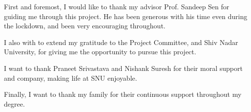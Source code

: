 \begin{acknowledgments}

First and foremost, I would like to thank my advisor Prof. Sandeep Sen for guiding me through this project. He has been generous with his time even during the lockdown, and been very encouraging throughout. 

\noindent
I also with to extend my gratitude to the Project Committee, and Shiv Nadar University, for giving me the opportunity to pursue this project.

\noindent
I want to thank Praneet Srivastava and Nishank Suresh for their moral support and company, making life at SNU enjoyable. 

\noindent
Finally, I want to thank my family for their continuous support throughout my degree.

\end{acknowledgments}

